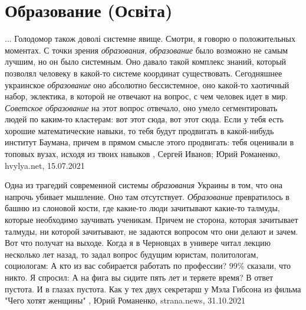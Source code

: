  
 
 
 
 
\chapter{Образование (Освіта)}
\label{sec:slova.obrazovanie.osvita}

... Голодомор також доволі системне явище.  Смотри, я говорю о положительных
моментах. С точки зрения \emph{образования}, \emph{образование} было возможно не самым
лучшим, но он было системным. Оно давало такой комплекс знаний, который
позволял человеку в какой-то системе координат существовать. Сегодняшнее
украинское \emph{образование} оно абсолютно бессистемное, оно какой-то хаотичный
набор, эклектика, в которой не отвечают на вопрос, с чем человек идет в мир.
\emph{Советское образование} на этот вопрос отвечало, оно умело сегментировать людей
по каким-то кластерам: вот этот сюда, вот этот сюда. Если у тебя есть хорошие
математические навыки, то тебя будут продвигать в какой-нибудь институт
Баумана, причем в прямом смысле этого продвигать: тебя оценивали в топовых
вузах, исходя из твоих навыков
, 
Сергей Иванов; Юрий Романенко, hvylya.net, 15.07.2021

Одна из трагедий современной системы \emph{образования} Украины в том, что она
напрочь убивает мышление. Оно там отсутствует. \emph{Образование} превратилось
в башню из слоновой кости, где какие-то люди зачитывают какие-то талмуды,
которые необходимо заучивать ученикам. Причем не сторона, которая зачитывает
талмуды, ни которой зачитывают, не задаются вопросом что они делают и зачем.
Вот что получат на выходе.  Когда я в Черновцах в универе читал лекцию
несколько лет назад, то задал вопрос будущим юристам, политологам, социологам:
А кто из вас собирается работать по профессии?  99\% сказали, что никто. Я
спросил: А на фига вы сидите пять лет и теряете время? В ответ пустота. И в
глазах пустота. Как у тех двух секретарш у Мэла Гибсона из фильма "Чего хотят
женщины"
, 
Юрий Романенко, strana.news, 31.10.2021
